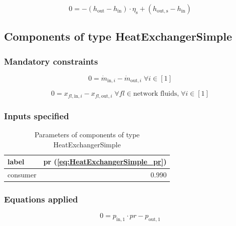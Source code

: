 \begin{equation}
\label{eq:Pump_eta_s}
0 =-\left(h_\mathrm{out}-h_\mathrm{in}\right)\cdot\eta_\mathrm{s}+\left(h_\mathrm{out,s}-h_\mathrm{in}\right)
\end{equation}


\subsection{Components of type HeatExchangerSimple}

\subsubsection{Mandatory constraints}

\begin{equation}
\label{eq:HeatExchangerSimple_mass_flow_constraints}
0=\dot{m}_{\mathrm{in,}i}-\dot{m}_{\mathrm{out,}i}\; \forall i \in [1]
\end{equation}

\begin{equation}
\label{eq:HeatExchangerSimple_fluid_constraints}
0=x_{fl\mathrm{,in,}i}-x_{fl\mathrm{,out,}i}\;\forall fl \in\text{network fluids,}\; \forall i \in [1]
\end{equation}


\subsubsection{Inputs specified}

\begin{table}[H]\begin{center}
\begin{tabular}{lr}
\toprule
    label &  pr (\ref{eq:HeatExchangerSimple_pr}) \\
\midrule
 consumer &                                 0.990 \\
\bottomrule
\end{tabular}
\caption{Parameters of components of type HeatExchangerSimple}
\end{center}\end{table}

\subsubsection{Equations applied}

\begin{equation}
\label{eq:HeatExchangerSimple_pr}
0=p_\mathrm{in,1}\cdot pr - p_\mathrm{out,1}
\end{equation}


